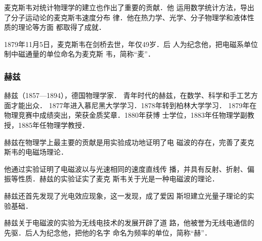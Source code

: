 麦克斯韦对统计物理学的建立也作出了重要的贡献．他
运用数学统计方法，导出了分子运动论的麦克斯韦速度分布
律．他在热力学、光学、分子物理学和液体性质的理论等方面
都取得了成就．

1879年11月5日，麦克斯韦在剑桥去世，年仅49岁．后
人为纪念他，把电磁系单位制中磁通量的单位命名为麦克斯
韦，简称“麦”．

\subsubsection{赫兹}
赫兹（1857—1894），德国物理学家．
青年时代的赫兹，在数学、科学和手工艺方面才能出众．
1877年进入慕尼黑大学学习．1878年转到柏林大学学习．
1879年在物理竞赛中成绩突出，荣获金质奖章．1880年获博
士学位，1883年任物理学副教授，1885年任物理学教授．

赫兹在物理学上最主要的贡献是用实验成功地证明了电
磁波的存在，完善了麦克斯韦的电磁场理论．

他通过实验证明了电磁波以与光速相同的速度直线传
播，并具有反射、折射、偏振等性质．赫兹的实验证实了麦克
斯韦关于光是一种电磁波的理论．

赫兹还首先发现了光电效应现象，这一发现，成了爱因
斯坦建立光量子理论的实验基础．

赫兹关于电磁波的实验为无线电技术的发展开辟了道
路，他被誉为无线电通信的先驱．后人为纪念他，把他的名字
命名为频率的单位，简称“赫”．